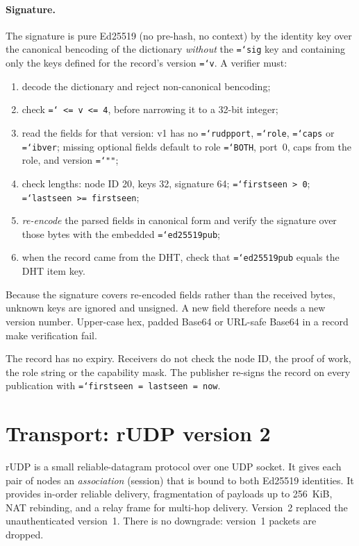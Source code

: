 \documentclass[11pt,a4paper]{article}
\newcommand{\code}[1]{\texttt{\hyphenchar\font=`\-\relax #1}}
\DeclareRobustCommand{\_}{\origunderscore\allowbreak}
\begin{document}
\paragraph{Signature.} The signature is pure Ed25519 (no pre-hash, no context) by the
identity key over the canonical bencoding of the dictionary \emph{without} the \code{sig} key
and containing only the keys defined for the record's version \code{v}.
A verifier must:
\begin{enumerate}
\item decode the dictionary and reject non-canonical bencoding;
\item check \code{1 <= v <= 4}, before narrowing it to a 32-bit integer;
\item read the fields for that version: v1 has no \code{rudp\_port}, \code{role},
  \code{caps} or \code{ib\_ver}; missing optional fields default to role \code{BOTH}, port~0,
  caps from the role, and version \code{""};
\item check lengths: node ID 20, keys 32, signature 64; \code{first\_seen > 0};
  \code{last\_seen >= first\_seen};
\item \emph{re-encode} the parsed fields in canonical form and verify the signature over
  those bytes with the embedded \code{ed25519\_pub};
\item when the record came from the DHT, check that \code{ed25519\_pub} equals the DHT item key.
\end{enumerate}
Because the signature covers re-encoded fields rather than the received bytes, unknown keys
are ignored and unsigned. A new field therefore needs a new version number. Upper-case hex,
padded Base64 or URL-safe Base64 in a record make verification fail.

The record has no expiry. Receivers do not check the node ID, the proof of work, the role
string or the capability mask. The publisher re-signs the record on every publication with
\code{first\_seen = last\_seen = now}.

\section{Transport: rUDP version 2}
\label{sec:transport}

rUDP is a small reliable-datagram protocol over one UDP socket. It gives each pair of nodes
an \emph{association} (session) that is bound to both Ed25519 identities. It provides
in-order reliable delivery, fragmentation of payloads up to 256~KiB, NAT rebinding, and a
relay frame for multi-hop delivery. Version~2 replaced the unauthenticated version~1. There
is no downgrade: version~1 packets are dropped.
\end{document}
